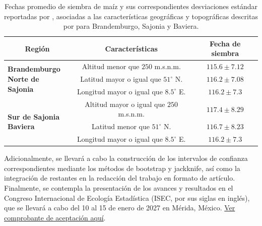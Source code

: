 \begin{table}[h]
	\centering
	\begin{tabular}{l|c|c}
		\hline
		\multicolumn{1}{c|}{\textbf{Región}} & \textbf{Características} & \textbf{Fecha de siembra} \\ \hline
		
		\multirow{3}{*}{\parbox{4.5cm}{\textbf{Brandemburgo}\\ \textbf{Norte de Sajonia}}} 
		& Altitud menor que $250$ m.s.n.m. 
		& $115.6 \pm 7.12$ \\ \cline{2-3}
		
		
		& Latitud mayor o igual que $51^\circ$ N. 
		& $116.2 \pm 7.08$ \\ \cline{2-3}
		
		& Longitud mayor o igual que $8.5^\circ$ E. 
		& $116.2 \pm 7.3$ \\ \hline
		
		
		\multirow{3}{*}{\parbox{4.5cm}{\textbf{Sur de Sajonia}\\ \textbf{Baviera}}}  
		& Altitud mayor o igual que $250$ m.s.n.m. 
		& $117.4 \pm 8.29$ \\ \cline{2-3}
		
		
		& Latitud menor que $51^\circ$ N. 
		& $116.7 \pm 8.23$ \\ \cline{2-3}
		
		& Longitud mayor o igual que $8.5^\circ$ E. 
		& $116.2 \pm 7.3$ \\ \hline
		
	\end{tabular}
	\caption{Fechas promedio de siembra de maíz y sus correspondientes desviaciones estándar reportadas por \cite{Parker_2016}, asociadas a las características geográficas y topográficas descritas por \cite{Flores_2025} para Brandemburgo, Sajonia y Baviera.}
	\label{Real_data}
\end{table}


Adicionalmente, se llevará a cabo la construcción de los intervalos de confianza correspondientes mediante los métodos de bootstrap y jackknife, así como la integración de restantes en la redacción del trabajo en formato de artículo. Finalmente, se contempla la presentación de los avances y resultados en el Congreso Internacional de Ecología Estadística (ISEC, por sus siglas en inglés), que se llevará a cabo del 10 al 15 de enero de 2027 en Mérida, México.   \href{https://drive.google.com/file/d/1y_0bCZc6UKrdhD0rQ020FxtoEe3sbJ3-/view?usp=sharing}{Ver comprobante de aceptación aquí}.




